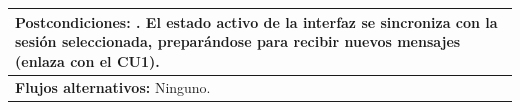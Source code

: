 \begin{longtable}{|p{15cm}|}
  \rowcolor{ulepsbased}
  \textbf{Postcondiciones:} \newline
  1. El estado activo de la interfaz se sincroniza con la sesión seleccionada, preparándose para recibir nuevos mensajes (enlaza con el CU1). \\ \hline

  \textbf{Flujos alternativos:} \newline
  Ninguno. \\ \hline

\end{longtable}
\endgroup
